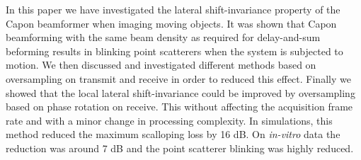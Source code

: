 \documentclass[draftcls]{IEEEtran}
\begin{document}
In this paper we have investigated the lateral shift-invariance property of the Capon beamformer when imaging moving objects. It was shown that Capon beamforming with the same beam density as required for delay-and-sum beforming results in blinking point scatterers when the system is subjected to motion.  We then discussed and investigated different methods based on oversampling on transmit and receive in order to reduced this effect. Finally we showed that the local lateral shift-invariance could be improved by oversampling based on phase rotation on receive. This without affecting the acquisition frame rate and with a minor change in processing complexity. In simulations, this method reduced the maximum scalloping loss by 16 dB. On \textit{in-vitro} data the reduction was around 7 dB and the point scatterer blinking was highly reduced. 


%
%



%
%
\end{document}
